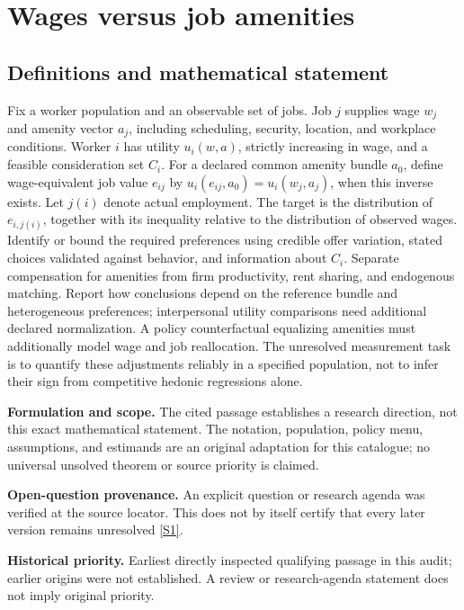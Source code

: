 \documentclass[11pt]{article}
\newcommand{\sref}[2]{\hyperlink{source:#1:#2}{[S#2]}}
\begin{document}
\section*{Wages versus job amenities}\label{30007637}
\subsection{Definitions and mathematical statement}
Fix a worker population and an observable set of jobs. Job \(j\) supplies wage \(w_j\) and amenity vector \(a_j\), including scheduling, security, location, and workplace conditions. Worker \(i\) has utility \(u_i(w,a)\), strictly increasing in wage, and a feasible consideration set \(C_i\). For a declared common amenity bundle \(a_0\), define wage-equivalent job value \(e_{ij}\) by \(u_i(e_{ij},a_0)=u_i(w_j,a_j)\), when this inverse exists. Let \(j(i)\) denote actual employment. The target is the distribution of \(e_{i,j(i)}\), together with its inequality relative to the distribution of observed wages. Identify or bound the required preferences using credible offer variation, stated choices validated against behavior, and information about \(C_i\). Separate compensation for amenities from firm productivity, rent sharing, and endogenous matching. Report how conclusions depend on the reference bundle and heterogeneous preferences; interpersonal utility comparisons need additional declared normalization. A policy counterfactual equalizing amenities must additionally model wage and job reallocation. The unresolved measurement task is to quantify these adjustments reliably in a specified population, not to infer their sign from competitive hedonic regressions alone.

\par\textbf{Formulation and scope.} The cited passage establishes a research direction, not this exact mathematical statement. The notation, population, policy menu, assumptions, and estimands are an original adaptation for this catalogue; no universal unsolved theorem or source priority is claimed.

\par\textbf{Open-question provenance.} An explicit question or research agenda was verified at the source locator. This does not by itself certify that every later version remains unresolved \sref{30007637}{1}.

\par\textbf{Historical priority.} Earliest directly inspected qualifying passage in this audit; earlier origins were not established. A review or research-agenda statement does not imply original priority.
\end{document}
